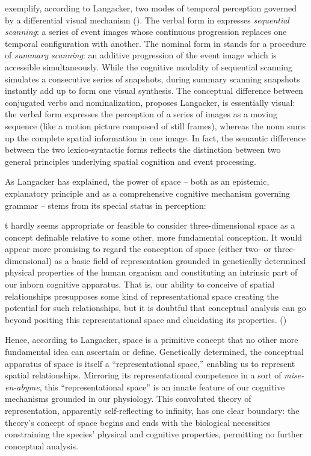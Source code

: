 \documentclass[english,output=paper,colorlinks,citecolor=brown]{../langscibook}
\begin{document}
exemplify, according to Langacker, two modes of temporal perception governed by a differential visual mechanism (\citeyear[146, example 19]{Langacker1987}). The verbal form in  expresses \textit{sequential scanning}: a series of event images whose continuous progression replaces one temporal configuration with another. The nominal form in  stands for a procedure of \textit{summary scanning}: an additive progression of the event image which is accessible simultaneously. While the cognitive modality of sequential scanning simulates a consecutive series of snapshots, during summary scanning snapshots instantly add up to form one visual synthesis. The conceptual difference between conjugated verbs and nominalization, proposes Langacker, is essentially visual: the verbal form expresses the perception of a series of images as a moving sequence (like a motion picture composed of still frames), whereas the noun sums up the complete spatial information in one image. In fact, the semantic difference between the two lexico-syntactic forms reflects the distinction between two general principles underlying spatial cognition and event processing.

\largerpage
As Langacker has explained, the power of space -- both as an epistemic, explanatory principle and as a comprehensive cognitive mechanism governing grammar -- stems from its special status in perception:

\begin{modquote}\relax
[I]t hardly seems appropriate or feasible to consider three-dimensional space as a concept definable relative to some other, more fundamental conception. It would appear more promising to regard the conception of space (either two- or three-dimensional) as a basic field of representation grounded in genetically determined physical properties of the human organism and constituting an intrinsic part of our inborn cognitive apparatus. That is, our ability to conceive of spatial relationships presupposes some kind of representational space creating the potential for such relationships, but it is doubtful that conceptual analysis can go beyond positing this representational space and elucidating its properties. (\citealt[148]{Langacker1987})
\end{modquote}

Hence, according to Langacker, space is a primitive concept that no other more fundamental idea can ascertain or define. Genetically determined, the conceptual apparatus of space is itself a “representational space,” enabling us to represent spatial relationships. Mirroring its representational competence in a sort of \textit{mise-en-abyme}, this “representational space” is an innate feature of our cognitive mechanisms grounded in our physiology. This convoluted theory of representation, apparently self-reflecting to infinity, has one clear boundary: the theory’s concept of space begins and ends with the biological necessities constraining the species’ physical and cognitive properties, permitting no further conceptual analysis. 
\end{document}
